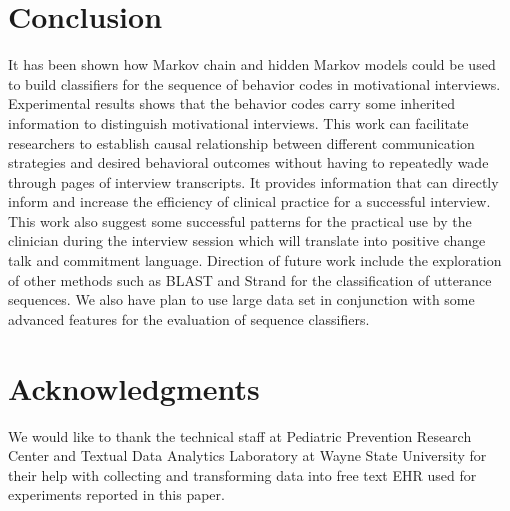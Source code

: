 \documentclass{amia}
\begin{document}
\section*{Conclusion}
It has been shown how Markov chain and hidden Markov models could be used to build classifiers for the sequence of behavior codes in motivational interviews. Experimental results shows that the behavior codes carry some inherited information to distinguish motivational interviews. This work can facilitate researchers to establish causal relationship between different communication strategies and desired behavioral outcomes without having to repeatedly wade through pages of interview transcripts. It provides information that can directly inform and increase the efficiency of clinical practice for a successful interview. This work also suggest some successful patterns for the practical use by the clinician during the interview session which will translate into positive change talk and commitment language. Direction of future work include the exploration of other methods such as BLAST \cite{altschul1990basic} and Strand \cite{drew2014strand} for the classification of utterance sequences. We also have plan to use large data set in conjunction with some advanced features for the evaluation of sequence classifiers. 


\section*{Acknowledgments}
We would like to thank the technical staff at Pediatric Prevention Research Center and Textual Data Analytics Laboratory at Wayne State University for their help with collecting and transforming data into free text EHR used for experiments reported in this paper. 



\end{document}
